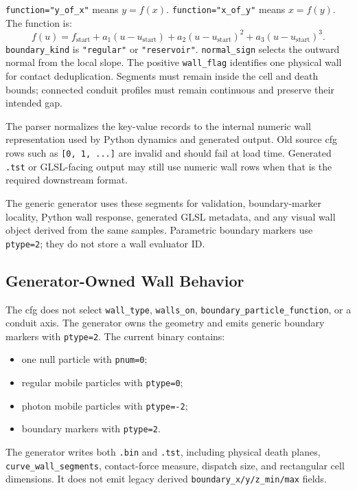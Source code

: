 \texttt{function="y\_of\_x"} means \(y=f(x)\).  \texttt{function="x\_of\_y"}
means \(x=f(y)\).  The function is:
\[
f(u)=f_{\mathrm{start}}+a_1(u-u_{\mathrm{start}})
     +a_2(u-u_{\mathrm{start}})^2
     +a_3(u-u_{\mathrm{start}})^3.
\]
\texttt{boundary\_kind} is \texttt{"regular"} or \texttt{"reservoir"}.
\texttt{normal\_sign} selects the outward normal from the local slope.  The
positive \texttt{wall\_flag} identifies one physical wall for contact
deduplication.  Segments must remain inside the cell and death bounds;
connected conduit profiles must remain continuous and preserve their intended
gap.

The parser normalizes the key-value records to the internal numeric wall
representation used by Python dynamics and generated output.  Old source cfg
rows such as \texttt{[0, 1, ...]} are invalid and should fail at load time.
Generated \texttt{.tst} or GLSL-facing output may still use numeric wall rows
when that is the required downstream format.

The generic generator uses these segments for validation, boundary-marker
locality, Python wall response, generated GLSL metadata, and any visual wall
object derived from the same samples.  Parametric boundary markers use
\texttt{ptype=2}; they do not store a wall evaluator ID.

\subsection{Generator-Owned Wall Behavior}

The cfg does not select \texttt{wall\_type}, \texttt{walls\_on},
\texttt{boundary\_particle\_function}, or a conduit axis.  The generator
owns the geometry and emits generic boundary markers with \texttt{ptype=2}.
The current binary contains:

\begin{itemize}
    \item one null particle with \texttt{pnum=0};
    \item regular mobile particles with \texttt{ptype=0};
    \item photon mobile particles with \texttt{ptype=-2};
    \item boundary markers with \texttt{ptype=2}.
\end{itemize}

The generator writes both \texttt{.bin} and \texttt{.tst}, including physical
death planes, \texttt{curve\_wall\_segments}, contact-force measure, dispatch
size, and rectangular cell dimensions.  It does not emit legacy derived
\texttt{boundary\_x/y/z\_min/max} fields.

